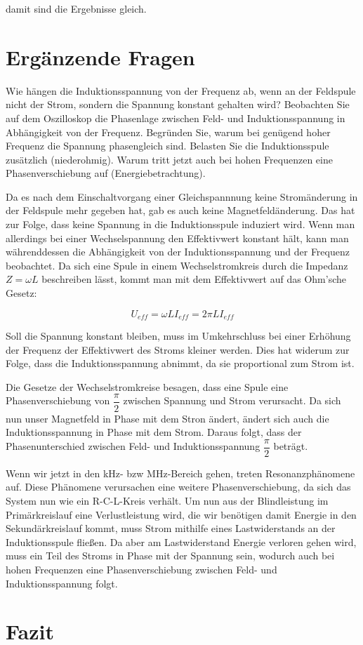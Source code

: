 \documentclass{article}
\begin{document}
damit sind die Ergebnisse gleich.\\

\newpage
\section{Ergänzende Fragen}
Wie hängen die Induktionsspannung von der Frequenz ab, wenn an der Feldspule nicht der Strom, sondern die Spannung konstant gehalten wird?
Beobachten Sie auf dem Oszilloskop die Phasenlage zwischen Feld- und Induktionsspannung in Abhängigkeit von der Frequenz.
Begründen Sie, warum bei genügend hoher Frequenz die Spannung phasengleich sind. Belasten Sie die Induktionsspule zusätzlich (niederohmig). Warum tritt jetzt auch bei hohen Frequenzen eine Phasenverschiebung auf (Energiebetrachtung).

\vspace{1cm}

Da es nach dem Einschaltvorgang einer Gleichspannnung keine Stromänderung in der Feldspule mehr gegeben hat, gab es auch keine Magnetfeldänderung. Das hat zur Folge, dass keine Spannung in die Induktionsspule induziert wird. Wenn man allerdings bei einer Wechselspannung den Effektivwert konstant hält, kann man währenddessen die Abhängigkeit von der Induktionsspannung und der Frequenz beobachtet.
Da sich eine Spule in einem Wechselstromkreis durch die Impedanz $Z=\omega L$ beschreiben lässt, kommt man mit dem Effektivwert auf das Ohm'sche Gesetz:

\begin{equation}
U_{eff}=\omega L I_{eff}=2\pi L I_{eff}
\end{equation}

Soll die Spannung konstant bleiben, muss im Umkehrschluss bei einer Erhöhung der Frequenz der Effektivwert des Stroms kleiner werden. Dies hat widerum zur Folge, dass die Induktionsspannung abnimmt, da sie proportional zum Strom ist.

Die Gesetze der Wechselstromkreise besagen, dass eine Spule eine Phasenverschiebung von $\dfrac{\pi}{2}$ zwischen Spannung und Strom verursacht. Da sich nun unser Magnetfeld in Phase mit dem Stron ändert, ändert sich auch die Induktionsspannung in Phase mit dem Strom. Daraus folgt, dass der Phasenunterschied zwischen Feld- und Induktionsspannung $\dfrac{\pi}{2}$ beträgt.

Wenn wir jetzt in den kHz- bzw MHz-Bereich gehen, treten Resonanzphänomene auf. Diese Phänomene verursachen eine weitere Phasenverschiebung, da sich das System nun wie ein R-C-L-Kreis verhält. Um nun aus der Blindleistung im Primärkreislauf eine Verlustleistung wird, die wir benötigen damit Energie in den Sekundärkreislauf kommt, muss Strom mithilfe eines Lastwiderstands an der Induktionsspule fließen. Da aber am Lastwiderstand Energie verloren gehen wird, muss ein Teil des Stroms in Phase mit der Spannung sein, wodurch auch bei hohen Frequenzen eine Phasenverschiebung zwischen Feld- und Induktionsspannung folgt.\\

\newpage

\section{Fazit}
\end{document}
